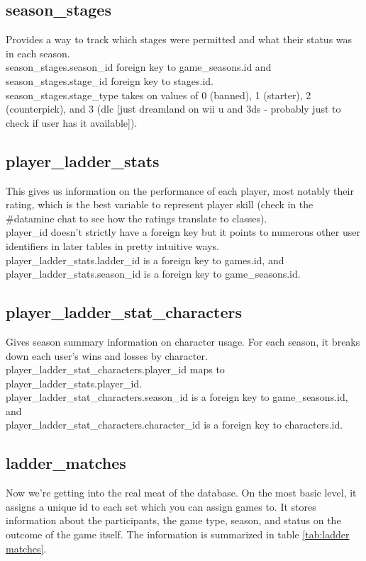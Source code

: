 \documentclass[12pt]{article}
\begin{document}
\subsection{season\_stages} %
\label{sub:season_stages}
Provides a way to track which stages were permitted and what their status was in each season. \\
season\_stages.season\_id foreign key to game\_seasons.id and season\_stages.stage\_id foreign key to stages.id. \\
season\_stages.stage\_type takes on values of 0 (banned), 1 (starter), 2 (counterpick), and 3 (dlc [just dreamland on wii u and 3ds - probably just to check if user has it available]).

\subsection{player\_ladder\_stats} %
\label{sub:player_ladder_stats}
This gives us information on the performance of each player, most notably their rating, which is the best variable to represent player skill (check in the \#datamine chat to see how the ratings translate to classes).\\
player\_id doesn't strictly have a foreign key but it points to numerous other user identifiers in later tables in pretty intuitive ways. \\
player\_ladder\_stats.ladder\_id is a foreign key to games.id, and player\_ladder\_stats.season\_id is a foreign key to game\_seasons.id.

\subsection{player\_ladder\_stat\_characters} %
\label{sub:player_ladder_stat_characters}
Gives season summary information on character usage.
For each season, it breaks down each user's wins and losses by character. \\
player\_ladder\_stat\_characters.player\_id maps to player\_ladder\_stats.player\_id. \\
player\_ladder\_stat\_characters.season\_id is a foreign key to game\_seasons.id, and \\ player\_ladder\_stat\_characters.character\_id is a foreign key to characters.id.

\subsection{ladder\_matches} %
\label{sub:ladder_matches}
Now we're getting into the real meat of the database. 
On the most basic level, it assigns a unique id to each set which you can assign games to. It stores information about the participants, the game type, season, and status on the outcome of the game itself.
The information is summarized in table \ref{tab:ladder matches}.
\end{document}
